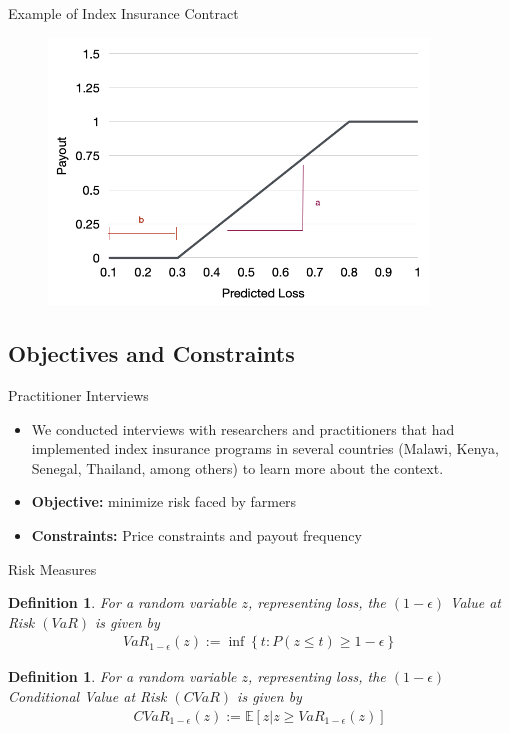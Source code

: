 \documentclass{beamer}
\newtheorem{defn}[theorem]{Definition}
\begin{document}
\begin{frame}{Example of Index Insurance Contract}
    \begin{figure}
        \centering
        \includegraphics[width=0.9\textwidth]{../../../output/figures/Presentation/sample_insurance_contract.png}
    \end{figure}
\end{frame}

\subsection{Objectives and Constraints}
\begin{frame}{Practitioner Interviews}
\begin{itemize}
   \setlength\itemsep{2em}
    \item We conducted interviews with researchers and practitioners that had implemented index insurance programs in several countries (Malawi, Kenya, Senegal, Thailand, among others) to learn more about the context. 
    \item \textbf{Objective:} minimize risk faced by farmers
    \item \textbf{Constraints:} Price constraints and payout frequency
\end{itemize}    
\end{frame}


\begin{frame}{Risk Measures}

\begin{defn}
    For a random variable $z$, representing loss, the $(1-\epsilon)$ Value at Risk $(VaR)$ is given by 
    \begin{align*}
      VaR_{1-\epsilon}(z) := \inf \left \{ t : P(z \leq t) \geq 1-\epsilon \right \}
    \end{align*}
  \end{defn}

  \begin{defn}
    For a random variable $z$, representing loss, the $(1-\epsilon)$ Conditional Value at Risk $(CVaR)$ is given by 
    \begin{align*}
      CVaR_{1-\epsilon}(z) := \mathbb{E}\left [z | z \geq VaR_{1-\epsilon}(z) \right ]
    \end{align*}
  \end{defn}
\end{frame}
\end{document}
